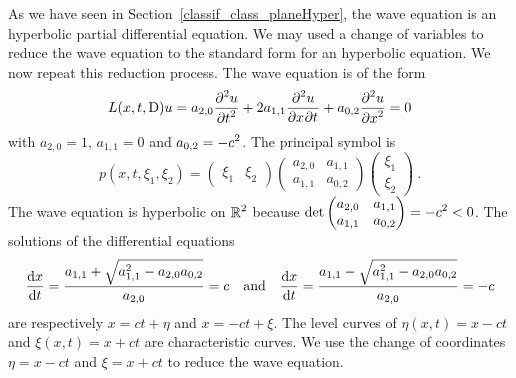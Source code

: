 As we have seen in Section~\ref{classif_class_planeHyper}, the wave equation
is an hyperbolic partial differential equation.  We may used a change
of variables to reduce the wave equation to the standard form for an
hyperbolic equation.  We now repeat this reduction process.  The wave
equation is of the form
\[
L(x,t,\diff)u = a_{2,0} \pdydxn{u}{t}{2} + 2 a_{1,1} \pdydxnm{u}{x}{t}{2}{}{} +
a_{0,2} \pdydxn{u}{x}{2} = 0
\]
with $a_{2,0} = 1$, $a_{1,1} = 0$ and $\DS a_{0,2}=-c^2$.
The principal symbol is
\[
p(x,t, \xi_1, \xi_2) =
\begin{pmatrix}
\xi_1 & \xi_2
\end{pmatrix}
\begin{pmatrix}
a_{2,0} & a_{1,1} \\
a_{1,1} & a_{0,2}
\end{pmatrix}
\begin{pmatrix}
\xi_1 \\ \xi_2
\end{pmatrix} \ .
\]
The wave equation is hyperbolic on $\DS \RR^2$ because
$\DS \det
\begin{pmatrix}
a_{2,0} & a_{1,1} \\
a_{1,1} & a_{0,2}
\end{pmatrix} = -c^2 < 0$.
The solutions of the differential equations
\[
\dydx{x}{t} = \frac{a_{1,1} + \sqrt{a_{1,1}^2 - a_{2,0} a_{0,2}}}{a_{2,0}} = c
\quad \text{and} \quad
\dydx{x}{t} = \frac{a_{1,1} - \sqrt{a_{1,1}^2 - a_{2,0} a_{0,2}}}{a_{2,0}} =-c
\]
are respectively $x=ct+\eta$ and $x=-ct+\xi$.  The level curves of
$\eta(x,t) = x-ct$ and $\xi(x,t) = x +ct$ are characteristic curves.  We use
the change of coordinates $\eta = x-ct$ and $\xi = x +ct$ to reduce the
wave equation.

